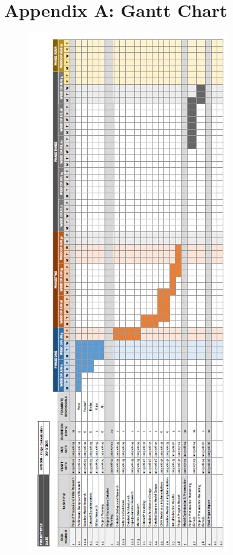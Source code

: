 \documentclass{article} %
\begin{document}
\section{Appendix A: Gantt Chart}
\begin{figure}[htbp]
  \centering
  \includegraphics[width=0.55\linewidth]{Figs/gant-chart-full.jpg}
  \label{fig:gantt_chart}
\end{figure}
\end{document}
